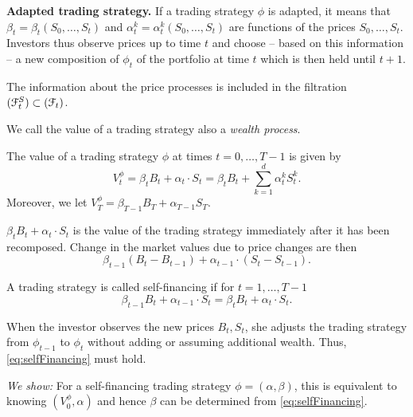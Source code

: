 \documentclass[12pt]{amsart}
\begin{document}
\textbf{Adapted trading strategy.} If a trading strategy \(\phi\) is adapted, it means that \(\beta_t = \beta_t(S_0, \dots, S_t)\) and \(\alpha_t^k = \alpha_t^k(S_0, \dots, S_t)\) are functions of the prices \(S_0, \dots, S_t\). Investors thus observe prices up to time \(t\) and choose -- based on this information -- a new composition of \(\phi_t\) of the portfolio at time \(t\) which is then held until \(t+1\).

The information about the price processes is included in the filtration \((\mathcal{F}_t^S) \subset (\mathcal{F}_t)\).

We call the value of a trading strategy also a \emph{wealth process}.

\begin{definition}
    The value of a trading strategy \(\phi\) at times \(t=0, \dots, T-1\) is given by \[
        V_t^\phi = \beta_t B_t + \alpha_t \cdot S_t = \beta_t B_t + \sum_{k=1}^d \alpha_t^k S_t^k.
    \]
    Moreover, we let \(V_T^\phi = \beta_{T-1} B_T + \alpha_{T-1} S_T\).
\end{definition}
\begin{remark}
    \(\beta_t B_t + \alpha_t \cdot S_t\) is the value of the trading strategy immediately after it has been recomposed. Change in the market values due to price changes are then \[
        \beta_{t-1} (B_t - B_{t-1}) + \alpha_{t-1} \cdot (S_t-S_{t-1}).
    \]
\end{remark}

\begin{definition}
    A trading strategy is called self-financing if for \(t=1, \dots, T-1\)
    \begin{equation}\label{eq:selfFinancing}
        \beta_{t-1} B_t + \alpha_{t-1} \cdot S_t = \beta_t B_t + \alpha_t \cdot S_t.
    \end{equation}
\end{definition}

\begin{remark}[Explanation]
    When the investor observes the new prices \(B_t, S_t\), she adjusts the trading strategy from \(\phi_{t-1}\) to \(\phi_t\) without adding or assuming additional wealth. Thus, \eqref{eq:selfFinancing} must hold.
\end{remark}

\emph{We show:} For a self-financing trading strategy \(\phi = (\alpha, \beta)\), this is equivalent to knowing \((V_0^\phi, \alpha)\) and hence \(\beta\) can be determined from \eqref{eq:selfFinancing}.
\end{document}
